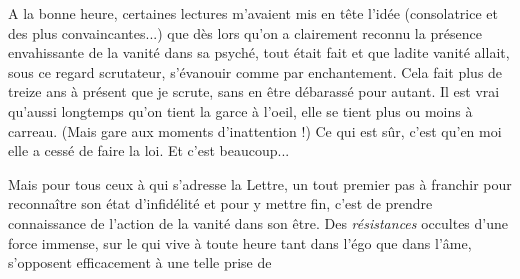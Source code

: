 A la bonne heure, certaines lectures m'avaient mis en tête l'idée (consolatrice et des plus convaincantes...) que dès lors qu'on a clairement reconnu la présence envahissante de la vanité dans sa psyché, tout était fait et que ladite vanité allait, sous ce regard scrutateur, s'évanouir comme par enchantement. Cela fait plus de treize ans à présent que je scrute, sans en être débarassé pour autant. Il est vrai qu'aussi longtemps qu'on tient la garce à l'oeil, elle se tient plus ou moins à carreau. (Mais gare aux moments d'inattention !) Ce qui est sûr, c'est qu'en moi elle a cessé de faire la loi. Et c'est beaucoup...

Mais pour tous ceux à qui s'adresse la Lettre, un tout premier pas à franchir pour reconnaître son état d'infidélité et pour y mettre fin, c'est de prendre connaissance de l'action de la vanité dans son être. Des \textit{résistances} occultes d'une force immense, sur le qui vive à toute heure tant dans l'égo que dans l'âme, s'opposent efficacement à une telle prise de

